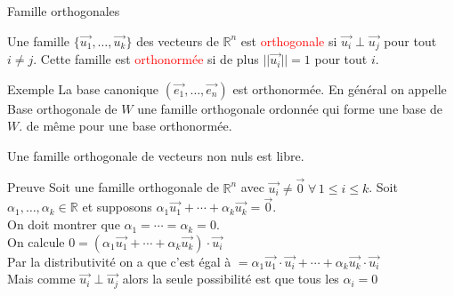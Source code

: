 \begin{parag}{Famille orthogonales}
    \begin{definition}
        Une famille $\{\vec{u_1}, \dots, \vec{u_k}\}$ des vecteurs de $\mathbb{R}^n$ est \textcolor{red}{orthogonale} si $\vec{u_i}\perp \vec{u_j}$ pour tout $i \neq j$. Cette famille est \textcolor{red}{orthonormée} si de plus $||\vec{u_i}|| = 1$ pour tout $i$.
    \end{definition}
    \begin{subparag}{Exemple}
        La base canonique $(\vec{e_1}, \dots, \vec{e_n})$ est orthonormée. En général on appelle Base orthogonale de $W$ une famille orthogonale ordonnée qui forme une base de $W$. de même pour une base orthonormée.
    \end{subparag}
    \begin{theoreme}
        Une famille orthogonale de vecteurs non nuls est libre.
    \end{theoreme}
    \begin{subparag}{Preuve}
        Soit une famille orthogonale de $\mathbb{R}^n$ avec $\vec{u_i} \neq \vec{0} \; \forall\, 1 \leq i \leq k$. Soit $\alpha_1, \dots, \alpha_k \in \mathbb{R}$ et supposons $\alpha_1 \vec{u_1} + \cdots + \alpha_k\vec{u_k} = \vec{0}$. \\
        On doit montrer que $\alpha_1 = \cdots = \alpha_k = 0$.
        \\
        On calcule $0 = (\alpha_1\vec{u_1} + \cdots + \alpha_k\vec{u_k})\cdot \vec{u_i}$\\
        Par la distributivité on a que c'est égal à $ = \alpha_1\vec{u_1}\cdot\vec{u_i} + \cdots + \alpha_k\vec{u_k}\cdot\vec{u_i}$\\
        Mais comme $\vec{u_i}\perp\vec{u_j}$ alors la seule possibilité est que tous les $\alpha_i = 0$
        
        
    \end{subparag}
\end{parag}


